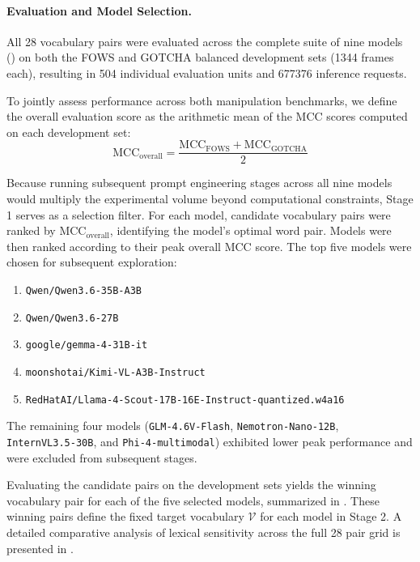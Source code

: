 \paragraph{Evaluation and Model Selection.}
All 28 vocabulary pairs were evaluated across the complete suite of nine models () on both the FOWS and GOTCHA balanced development sets (\num{1344} frames each), resulting in 504 individual evaluation units and \num{677376} inference requests.

To jointly assess performance across both manipulation benchmarks, we define the overall evaluation score as the arithmetic mean of the MCC scores computed on each development set:
\begin{equation}
    \text{MCC}_{\text{overall}} = \frac{\text{MCC}_{\text{FOWS}} + \text{MCC}_{\text{GOTCHA}}}{2}
    \label{eq:mcc_overall}
\end{equation}

Because running subsequent prompt engineering stages across all nine models would multiply the experimental volume beyond computational constraints, Stage 1 serves as a selection filter. For each model, candidate vocabulary pairs were ranked by $\text{MCC}_{\text{overall}}$, identifying the model's optimal word pair. Models were then ranked according to their peak overall MCC score. The top five models were chosen for subsequent exploration:
\begin{enumerate}
    \item \texttt{Qwen/Qwen3.6-35B-A3B}
    \item \texttt{Qwen/Qwen3.6-27B}
    \item \texttt{google/gemma-4-31B-it}
    \item \texttt{moonshotai/Kimi-VL-A3B-Instruct}
    \item \texttt{RedHatAI/Llama-4-Scout-17B-16E-Instruct-quantized.w4a16}
\end{enumerate}
The remaining four models (\texttt{GLM-4.6V-Flash}, \texttt{Nemotron-Nano-12B}, \\\texttt{InternVL3.5-30B}, and \texttt{Phi-4-multimodal}) exhibited lower peak performance and were excluded from subsequent stages.

Evaluating the candidate pairs on the development sets yields the winning vocabulary pair for each of the five selected models, summarized in . These winning pairs define the fixed target vocabulary $\mathcal{V}$ for each model in Stage 2. A detailed comparative analysis of lexical sensitivity across the full 28 pair grid is presented in .

